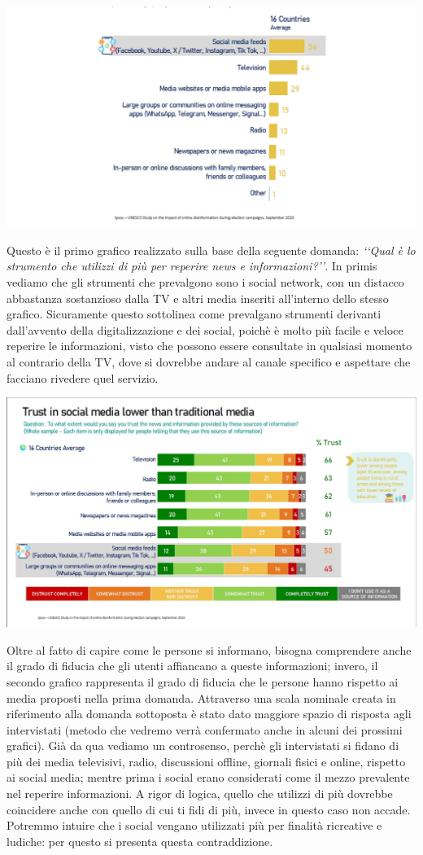 \documentclass{article}
\begin{document}
\centering\includegraphics[width=0.6\linewidth]{Immagini/Grafico1.jpg}\\
    \begin{justify}
    Questo è il primo grafico realizzato sulla base della seguente domanda: \textit{‘‘Qual è lo strumento che utilizzi di più per reperire news e informazioni?’’}.
    In primis vediamo che gli strumenti che prevalgono sono i social network, con un distacco abbastanza sostanzioso dalla TV e altri media inseriti all'interno dello stesso grafico. Sicuramente questo sottolinea come prevalgano strumenti derivanti dall'avvento della digitalizzazione e dei social, poichè è molto più facile e veloce reperire le informazioni, visto che possono essere consultate in qualsiasi momento al contrario della TV, dove si dovrebbe andare al canale specifico e aspettare che facciano rivedere quel servizio.
    
\begin{center}
\includegraphics[width=0.6\linewidth]{Immagini/Grafico2.jpg}\\
\end{center}
    Oltre al fatto di capire come le persone si informano, bisogna comprendere anche il grado di fiducia che gli utenti affiancano a queste informazioni; invero, il secondo grafico rappresenta il grado di fiducia che le persone hanno rispetto ai media proposti nella prima domanda.
    Attraverso una scala nominale creata in riferimento alla domanda sottoposta è stato dato maggiore spazio di risposta agli intervistati (metodo che vedremo verrà confermato anche in alcuni dei prossimi grafici).
    Già da qua vediamo un controsenso, perchè gli intervistati si fidano di più dei media televisivi, radio, discussioni offline, giornali fisici e online, rispetto ai social media; mentre prima i social erano considerati come il mezzo prevalente nel reperire informazioni. A rigor di logica, quello che utilizzi di più dovrebbe coincidere anche con quello di cui ti fidi di più, invece in questo caso non accade. Potremmo intuire che i social vengano utilizzati più per finalità ricreative e ludiche: per questo si presenta questa contraddizione.
    

\end{justify}
\end{document}
